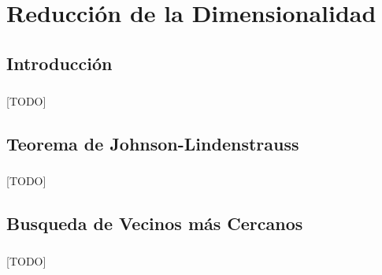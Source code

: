 \documentclass{subfiles}
\begin{document}
  \chapter{Reducción de la Dimensionalidad}
  \label{chap:dimensionality}

    \section{Introducción}
    \label{sec:dimensionality_intro}

      \paragraph{}
      [TODO]

    \section{Teorema de Johnson-Lindenstrauss}
    \label{sec:jl_theorem}

      \paragraph{}
      [TODO]

    \section{Busqueda de Vecinos más Cercanos}
    \label{sec:nearest_neighborhood_search}

      \paragraph{}
      [TODO]
\end{document}
